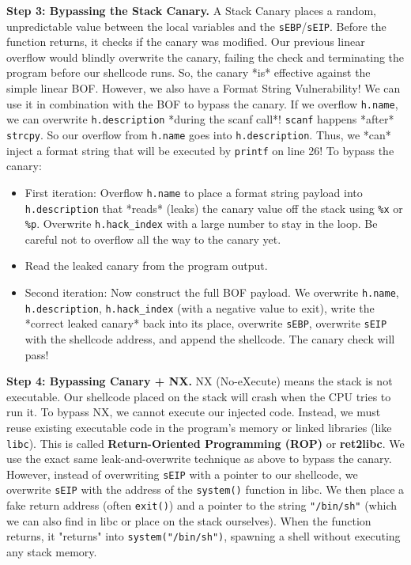\documentclass{article}
\begin{document}
\textbf{Step 3: Bypassing the Stack Canary.}
A Stack Canary places a random, unpredictable value between the local variables and the \texttt{sEBP}/\texttt{sEIP}. Before the function returns, it checks if the canary was modified. Our previous linear overflow would blindly overwrite the canary, failing the check and terminating the program before our shellcode runs.
So, the canary *is* effective against the simple linear BOF.
However, we also have a Format String Vulnerability! We can use it in combination with the BOF to bypass the canary.
If we overflow \texttt{h.name}, we can overwrite \texttt{h.description} *during the scanf call*! \texttt{scanf} happens *after* \texttt{strcpy}. So our overflow from \texttt{h.name} goes into \texttt{h.description}.
Thus, we *can* inject a format string that will be executed by \texttt{printf} on line 26!
To bypass the canary:
\begin{itemize}
    \item[\textbf{1.}] First iteration: Overflow \texttt{h.name} to place a format string payload into \texttt{h.description} that *reads* (leaks) the canary value off the stack using \texttt{\%x} or \texttt{\%p}. Overwrite \texttt{h.hack\_index} with a large number to stay in the loop. Be careful not to overflow all the way to the canary yet.
    \item[\textbf{2.}] Read the leaked canary from the program output.
    \item[\textbf{3.}] Second iteration: Now construct the full BOF payload. We overwrite \texttt{h.name}, \texttt{h.description}, \texttt{h.hack\_index} (with a negative value to exit), write the *correct leaked canary* back into its place, overwrite \texttt{sEBP}, overwrite \texttt{sEIP} with the shellcode address, and append the shellcode. The canary check will pass!

\end{itemize}
\textbf{Step 4: Bypassing Canary + NX.}
NX (No-eXecute) means the stack is not executable. Our shellcode placed on the stack will crash when the CPU tries to run it.
To bypass NX, we cannot execute our injected code. Instead, we must reuse existing executable code in the program's memory or linked libraries (like \texttt{libc}). This is called \textbf{Return-Oriented Programming (ROP)} or \textbf{ret2libc}.
We use the exact same leak-and-overwrite technique as above to bypass the canary. However, instead of overwriting \texttt{sEIP} with a pointer to our shellcode, we overwrite \texttt{sEIP} with the address of the \texttt{system()} function in libc. We then place a fake return address (often \texttt{exit()}) and a pointer to the string \texttt{"/bin/sh"} (which we can also find in libc or place on the stack ourselves). When the function returns, it "returns" into \texttt{system("/bin/sh")}, spawning a shell without executing any stack memory.
\end{document}
